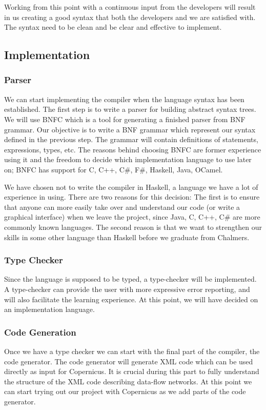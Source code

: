 \documentclass[a4paper]{article}
\begin{document}
Working from this point with a continuous input from the developers
will result in us creating a good syntax that both the developers and
we are satisfied with. The syntax need to be clean and be clear and
effective to implement.

\subsection{Implementation}
\subsubsection{Parser}
We can start implementing the compiler when the language syntax has
been established. The first step is to write a parser for building
abstract syntax trees. We will use BNFC which is a tool for generating
a finished parser from BNF grammar. Our objective is to write a BNF
grammar which represent our syntax defined in the previous step. The
grammar will contain definitions of statements, expressions, types,
etc. The reasons behind choosing BNFC are former experience using it
and the freedom to decide which implementation language to use later
on; BNFC has support for C, C++, C\#, F\#, Haskell, Java, OCamel.

We have chosen not to write the compiler in Haskell, a language we
have a lot of experience in using. There are two reasons for this
decision: The first is to ensure that anyone can more easily take over
and understand our code (or write a graphical interface) when we leave
the project, since Java, C, C++, C\# are more commonly known
languages. The second reason is that we want to strengthen our skills
in some other language than Haskell before we graduate from Chalmers.

\subsubsection{Type Checker}
Since the language is supposed to be typed, a type-checker will be
implemented. A type-checker can provide the user with more expressive
error reporting, and will also facilitate the learning experience. At
this point, we will have decided on an implementation language.

\subsubsection{Code Generation}
Once we have a type checker we can start with the final part of the
compiler, the code generator. The code generator will generate XML
code which can be used directly as input for Copernicus. It is crucial
during this part to fully understand the structure of the XML code
describing data-flow networks. At this point we can start trying out
our project with Copernicus as we add parts of the code generator.
\end{document}
